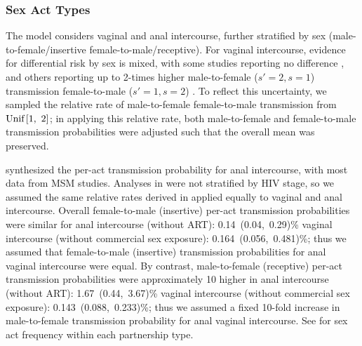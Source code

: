 \subsubsection{Sex Act Types}\label{mod.par.beta.sex}
The model considers vaginal and anal intercourse,
further stratified by sex (male-to-female/insertive \vs female-to-male/receptive).
For vaginal intercourse, evidence for differential risk by sex is mixed,
with some studies reporting no difference \cite{Wawer2005,Hughes2012},
and others reporting up to 2-times higher male-to-female ($s'=2,s=1$) transmission
\vs female-to-male ($s'=1,s=2$) \cite{Gregson2002mix,Boily2009}.
To reflect this uncertainty, we sampled
the relative rate of male-to-female \vs female-to-male transmission from $\textnormal{Unif}\,[1,~2]$;
in applying this relative rate, both male-to-female and female-to-male transmission probabilities
were adjusted such that the overall mean was preserved.
\par
\citet{Baggaley2018sr} synthesized the per-act transmission probability for anal intercourse,
with most data from MSM studies.
Analyses in \cite{Baggaley2018sr} were not stratified by HIV stage,
so we assumed the same relative rates derived in 
applied equally to vaginal and anal intercourse.
Overall female-to-male (insertive) per-act transmission probabilities were similar for
anal intercourse \cite{Baggaley2013} (without ART): 0.14~(0.04,~0.29)\% \vs
vaginal intercourse \cite{Boily2009} (without commercial sex exposure): 0.164~(0.056,~0.481)\%;
thus we assumed that female-to-male (insertive) transmission probabilities
for anal \vs vaginal intercourse were equal.
By contrast, male-to-female (receptive) per-act transmission probabilities were approximately 10 higher
in anal intercourse \cite{Baggaley2018sr} (without ART): 1.67~(0.44,~3.67)\% \vs
vaginal intercourse \cite{Boily2009} (without commercial sex exposure): 0.143~(0.088,~0.233)\%;
thus we assumed a fixed 10-fold increase in male-to-female transmission probability
for anal \vs vaginal intercourse.
See  for sex act frequency within each partnership type.
